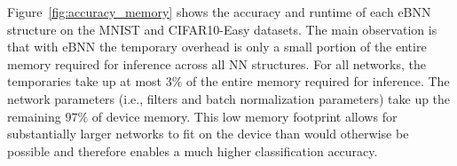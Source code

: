 \documentclass[10pt,emptycopyrightspace]{ewsn-proc}
\begin{document}


Figure~\ref{fig:accuracy_memory} shows the accuracy and runtime of each eBNN structure on the MNIST and CIFAR10-Easy datasets. The main observation is that with eBNN the temporary overhead is only a small portion of the entire memory required for inference across all NN structures. For all networks, the temporaries take up at most $3\%$ of the entire memory required for inference. The network parameters (i.e., filters and batch normalization parameters) take up the remaining $97\%$ of device memory. This low memory footprint allows for substantially larger networks to fit on the device than would otherwise be possible and therefore enables a much higher classification accuracy.  %
\end{document}
